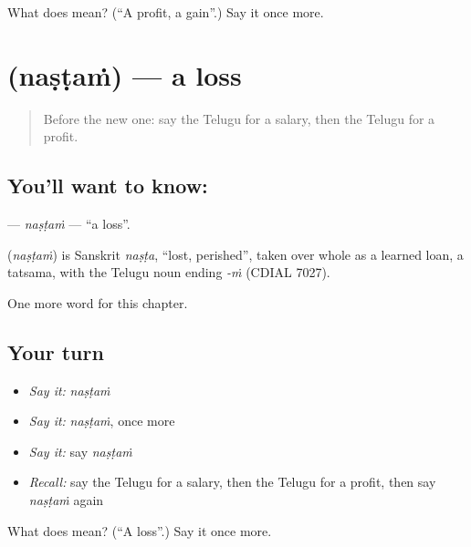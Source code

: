 \begin{tcolorbox}[breakable,colback=teal!4,colframe=teal!35!black,title={Before you move on}]
What does  mean? (\textquotedblleft{}A profit, a gain\textquotedblright{}.) Say it once more.
\end{tcolorbox}
\section[\texorpdfstring{\te{నష్టం} (naṣṭaṁ)}{నష్టం (naṣṭaṁ)}]{ (naṣṭaṁ) — a loss}

\label{lesson:TE-C235-nastam}



\begin{quote}
Before the new one: say the Telugu for a salary, then the Telugu for a profit.
\end{quote}

\subsection*{You'll want to know: }
\textbf{} — \emph{naṣṭaṁ} — \textquotedblleft{}a loss\textquotedblright{}.

\begin{cousinweb}
\textbf{} (\emph{naṣṭaṁ}) is Sanskrit \emph{naṣṭa}, \textquotedblleft{}lost, perished\textquotedblright{}, taken over whole as a learned loan, a tatsama, with the Telugu noun ending \emph{-ṁ} (CDIAL 7027).
\end{cousinweb}

\begin{grammarlens}[title={What you've built}]
One more word for this chapter.
\end{grammarlens}

\subsection*{Your turn}
\begin{itemize}
\raggedright
  \item \emph{Say it:} \emph{naṣṭaṁ}
  \item \emph{Say it:} \emph{naṣṭaṁ}, once more
  \item \emph{Say it:} say \emph{naṣṭaṁ}
  \item \emph{Recall:} say the Telugu for a salary, then the Telugu for a profit, then say \emph{naṣṭaṁ} again
\end{itemize}

\begin{tcolorbox}[breakable,colback=teal!4,colframe=teal!35!black,title={Before you move on}]
What does  mean? (\textquotedblleft{}A loss\textquotedblright{}.) Say it once more.
\end{tcolorbox}
